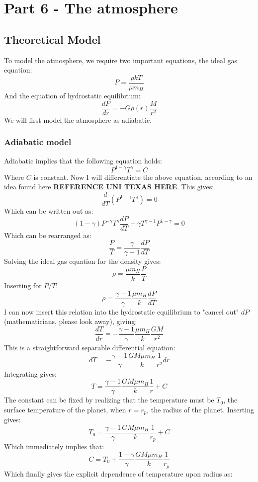 \documentclass[a4paper,10pt,english]{article}
\begin{document}
\section{Part 6 - The atmosphere}
\subsection{Theoretical Model}
To model the atmosphere, we require two important equations, the ideal gas equation:
\begin{equation}
P=\frac{\rho k T}{\mu m_H}
\end{equation} 
And the equation of hydrostatic equilibrium:
\begin{equation}
\frac{dP}{dr}=-G\rho(r)\frac{M}{r^2}
\end{equation}
We will first model the atmosphere as adiabatic.
\subsubsection{Adiabatic model}
Adiabatic implies that the following equation holds:
\begin{equation}
P^{1-\gamma}T^\gamma=C
\end{equation}
Where $C$ is constant. Now I will differentiate the above equation, according to an idea found here \textbf{REFERENCE UNI TEXAS HERE}. This gives:
$$\frac{d}{dT}\left(P^{1-\gamma}T^{\gamma}\right)=0$$
Which can be written out as:
$$(1-\gamma)P^{-\gamma}T^{\gamma}\frac{dP}{dT}+\gamma T^{\gamma-1}P^{1-\gamma}=0$$
Which can be rearranged as:
$$\frac{P}{T}=\frac{\gamma}{\gamma-1}\frac{dP}{dT}$$
Solving the ideal gas equation for the density gives:
$$\rho=\frac{\mu m_H}{k}\frac{P}{T}$$
Inserting for $P/T$:
$$\rho=\frac{\gamma-1}{\gamma}\frac{\mu m_H}{k}\frac{dP}{dT}$$
I can now insert this relation into the hydrostatic equilibrium to "cancel out" $dP$ (mathematicians, please look away), giving:
$$\frac{dT}{dr}=-\frac{\gamma-1}{\gamma}\frac{\mu m_H}{k}\frac{GM}{r^2}$$
This is a straightforward separable differential equation:
$$ dT = -\frac{\gamma-1}{\gamma}\frac{GM\mu m_H}{k}\frac{1}{r^2} dr$$
Integrating gives:
$$T=\frac{\gamma-1}{\gamma}\frac{GM\mu m_H}{k}\frac{1}{r}+C$$
The constant can be fixed by realizing that the temperature must be $T_0$, the surface temperature of the planet, when $r=r_p$, the radius of the planet. Inserting gives:
$$T_0=\frac{\gamma-1}{\gamma}\frac{GM\mu m_H}{k}\frac{1}{r_p}+C$$
Which immediately implies that:
$$C=T_0+\frac{1-\gamma}{\gamma}\frac{GM\mu m_H}{k}\frac{1}{r_p}$$
Which finally gives the explicit dependence of temperature upon radius as:
\end{document}
